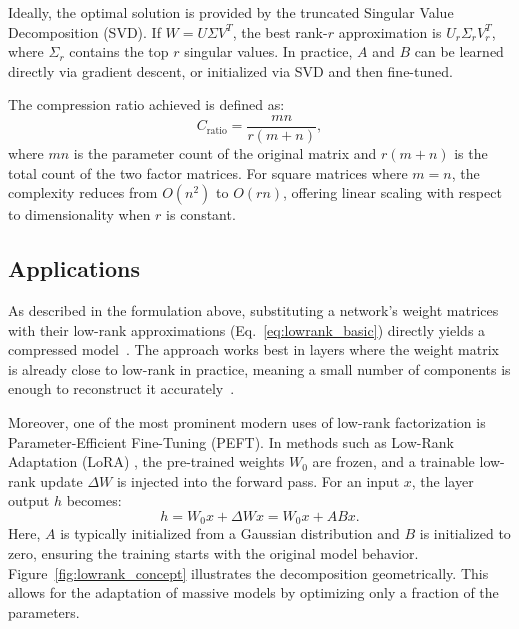 Ideally, the optimal solution is provided by the truncated Singular Value Decomposition (SVD). If $W = U \Sigma V^T$, the best rank-$r$ approximation is $U_r \Sigma_r V_r^T$, where $\Sigma_r$ contains the top $r$ singular values. In practice, $A$ and $B$ can be learned directly via gradient descent, or initialized via SVD and then fine-tuned.

The compression ratio achieved is defined as:
\begin{equation}
    C_{\text{ratio}} = \frac{mn}{r(m+n)},
\end{equation}
where $mn$ is the parameter count of the original matrix and $r(m+n)$ is the total count of the two factor matrices. For square matrices where $m=n$, the complexity reduces from $O(n^2)$ to $O(rn)$, offering linear scaling with respect to dimensionality when $r$ is constant.

\subsection{Applications}

As described in the formulation above, substituting a network's weight matrices with their low-rank approximations (Eq.~\ref{eq:lowrank_basic}) directly yields a compressed model~\cite{eckart1936approximation,xue2013restructuring,sainath2013lowrank}. The approach works best in layers where the weight matrix is already close to low-rank in practice, meaning a small number of components is enough to reconstruct it accurately~\cite{eckart1936approximation,xue2013restructuring}.

Moreover, one of the most prominent modern uses of low-rank factorization is Parameter-Efficient Fine-Tuning (PEFT). In methods such as Low-Rank Adaptation (LoRA) \cite{hu2021lora}, the pre-trained weights $W_0$ are frozen, and a trainable low-rank update $\Delta W$ is injected into the forward pass. For an input $x$, the layer output $h$ becomes:
\begin{equation}
    h = W_0 x + \Delta W x = W_0 x + AB x.
\end{equation}
Here, $A$ is typically initialized from a Gaussian distribution and $B$ is initialized to zero, ensuring the training starts with the original model behavior. Figure~\ref{fig:lowrank_concept} illustrates the decomposition geometrically. This allows for the adaptation of massive models by optimizing only a fraction of the parameters.


